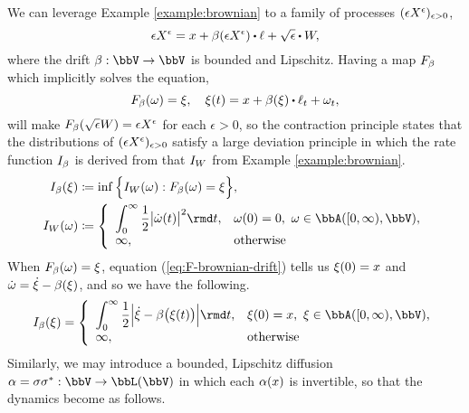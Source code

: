 \begin{example}[Diffusions]
  \label{example:diffusion}
  We can leverage Example \ref{example:brownian} to a family of processes $(\epsilon X^\epsilon)_{\epsilon>0}$,
  \begin{equation*}
    \Xe = \stateVar + \affDrift(\Xe) \shortInt \leb + \sqrt\epsilon \shortInt \W,
  \end{equation*}
  where the drift $\affDrift: \vecSpace \rightarrow \vecSpace$ is bounded and Lipschitz.
  Having a map $F_\beta$ which implicitly solves the equation,
  \begin{equation}
    \label{eq:F-brownian-drift}
    F_\affDrift(\omega) = \pathVar, \quad \pathVar(t) = \stateVar + \affDrift(\pathVar) \shortInt \leb_t + \omega_t,
  \end{equation}
  will make $F_\beta(\sqrt\epsilon W) = \epsilon X^\epsilon$ for each $\epsilon > 0$, so the contraction principle states that the distributions of $(\epsilon X^\epsilon)_{\epsilon>0}$ satisfy a large deviation principle in which the rate function $I_\beta$ is derived from that $I_W$ from Example \ref{example:brownian}.
  \begin{align*}
    \rf_\affDrift(\pathVar) &\defeq \inf\Big\{ \rf_\W(\omega) : F_\affDrift(\omega) = \pathVar \Big\},\\
    \rf_\W(\omega) &\defeq \left\{\begin{array}{ll}
      \displaystyle\int_0^\infty \frac12\big|\dot\omega(t)\big|^2 \rmd t, & \omega(0) = 0, ~ \omega \in \acpathSpace{[0,\infty)}{\vecSpace}, \\
      \infty, & \text{otherwise}
    \end{array}\right.
  \end{align*}
  When $F_\beta(\omega) = \xi$, equation (\ref{eq:F-brownian-drift}) tells us $\xi(0) = x$ and $\dot\omega = \dot{\xi} - \beta(\xi)$, and so we have the following.
  \begin{equation*}
    \rf_\affDrift(\pathVar) = \left\{\begin{array}{ll}
      \displaystyle \int_0^\infty \frac12 \Big|\dot\pathVar - \affDrift\big(\pathVar(t)\big)\Big| \rmd t, & \pathVar(0) = \stateVar, ~ \pathVar \in \acpathSpace{[0,\infty)}{\vecSpace}, \\
      \infty, & \text{otherwise}
    \end{array}\right.
  \end{equation*}
  Similarly, we may introduce a bounded, Lipschitz diffusion $\affDiff = \affDiffSqrt\affDiffSqrt^*: \vecSpace \rightarrow \bbL(\vecSpace)$ in which each $\alpha(x)$ is invertible, so that the dynamics become as follows.

\end{example}
